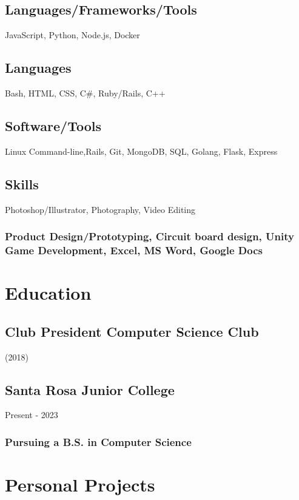 \documentclass{article}
\begin{document}
		\subsection{Languages/Frameworks/Tools}
		JavaScript, Python, Node.js, Docker
		\subsection{Languages}
		Bash, HTML, CSS,  C\#, Ruby/Rails, C++
		\vspace{-2mm}
		
		\subsection{Software/Tools}
		Linux Command-line,Rails, Git, MongoDB, SQL, Golang, Flask, Express
		\vspace{-3mm}
		\subsection{Skills}Photoshop/Illustrator, Photography, Video Editing
		\vspace{-3mm}
		\subsubsection{Product Design/Prototyping, Circuit board design,  Unity Game Development, Excel, MS Word, Google Docs}
		\vspace{-3mm}
    		
    		    		
	\section{Education}
        \subsection{Club President  Computer Science Club}  (2018)
        \vspace{-2mm}   
         
        \subsection{Santa Rosa Junior College} Present - 2023 
        \vspace{-2mm}
            \subsubsection{Pursuing a B.S. in Computer Science}
\section{Personal Projects}
\end{document}
